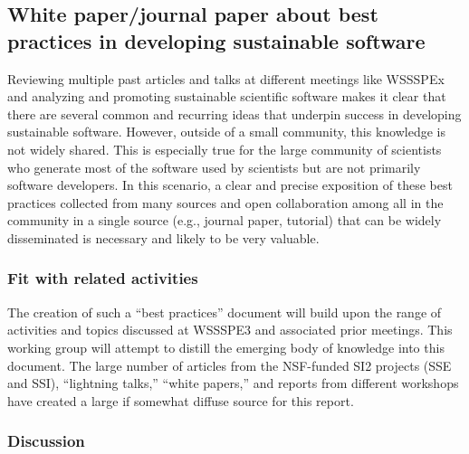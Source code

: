 \subsection{White paper/journal paper about best practices in developing sustainable software}
\label{sec:best-practices}

Reviewing multiple past articles and talks at different meetings like WSSSPEx
\cite{WSSSPE1, WSSSPE2, 5069157, Blatt_WSSSPE, Ahern_WSSSPE} and analyzing and
promoting sustainable scientific software makes it clear that there are several
common and recurring ideas that underpin success in developing sustainable
software. However, outside of a small community, this knowledge is not widely
shared. This is especially true for the large community of scientists who
generate most of the software used by scientists but are not primarily software
developers. In this scenario, a clear and precise exposition of these best
practices collected from many sources and open collaboration among all in the
community in a single source (e.g., journal paper, tutorial) that can be widely
disseminated is necessary and likely to be very valuable.

\subsubsection{Fit with related activities}

The creation of such a ``best practices'' document will build upon the range of
activities and topics discussed at WSSSPE3 and associated prior meetings. This
working group
will attempt to distill the emerging body of knowledge into this document. The
large number of articles from the NSF-funded SI2 projects (SSE and SSI),
``lightning talks,'' ``white papers,'' and reports from different workshops have
created a large if somewhat diffuse source for this report.

\subsubsection{Discussion}

